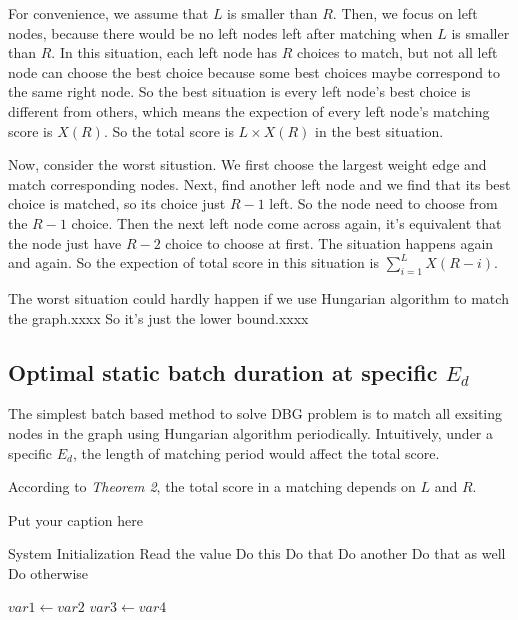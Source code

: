 \begin{IEEEproof}
 For convenience, we assume that $L$ is smaller than $R$. Then, we focus on left nodes, because there would be no left nodes left after matching when $L$ is smaller than $R$. In this situation, each left node has $R$ choices to match, but not all left node can choose the best choice because some best choices maybe correspond to the same right node. So the best situation is every left node's best choice is different from others, which means the expection of every left node's matching score is $X(R)$. So the total score is $L\times X(R)$ in the best situation. 
 \par Now, consider the worst situstion. We first choose the largest weight edge and match corresponding nodes. Next, find another left node and we find that its best choice is matched, so its choice just $R-1$ left. So the node need to choose from the $R-1$ choice. Then the next left node come across again, it's equivalent that the node just have $R-2$ choice to choose at first. The situation happens again and again. So the expection of total score in this situation is  $\sum_{i=1}^L{X(R-i)}$. 
 \par The worst situation could hardly happen if we use Hungarian algorithm to match the graph.xxxx So it's just the lower bound.xxxx
\end{IEEEproof}

\subsection{Optimal static batch duration at specific $E_d$}
\par The simplest batch based method to solve DBG problem is to match all exsiting nodes in the graph using Hungarian algorithm periodically. Intuitively, under a specific $E_d$, the length of matching period would affect the total score.
\par According to \emph{Theorem 2}, the total score in a matching depends on $L$ and $R$.  
\begin{algorithm}[H]
\caption{Put your caption here}
\begin{algorithmic}[1]

       
    \State System Initialization
    \State Read the value 
        \State Do this
        \State Do that
        \State Do another
        \State Do that as well
        \Else
        \State Do otherwise
        \EndIf
    \EndIf

      
        \State $var1 \leftarrow var2$  
        \State $var3 \leftarrow var4$
    \EndWhile  \label{roy's loop}
\EndProcedure
\end{algorithmic}
\end{algorithm}


